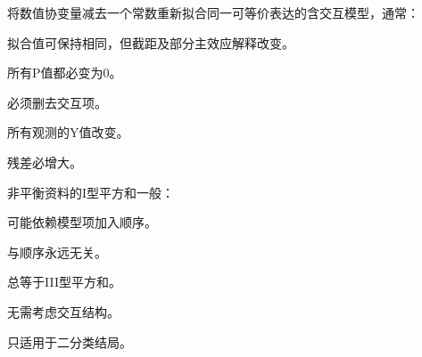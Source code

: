 \par\addvspace{6pt}\noindent\begin{minipage}{\linewidth}


将数值协变量减去一个常数重新拟合同一可等价表达的含交互模型，通常：


\begin{choices}

\item 拟合值可保持相同，但截距及部分主效应解释改变。

\item 所有P值都必变为0。

\item 必须删去交互项。

\item 所有观测的Y值改变。

\item 残差必增大。

\end{choices}

\end{minipage}\par\vspace{4pt}

\par\addvspace{6pt}\noindent\begin{minipage}{\linewidth}


非平衡资料的I型平方和一般：


\begin{choices}

\item 可能依赖模型项加入顺序。

\item 与顺序永远无关。

\item 总等于III型平方和。

\item 无需考虑交互结构。

\item 只适用于二分类结局。

\end{choices}

\end{minipage}\par\vspace{4pt}

